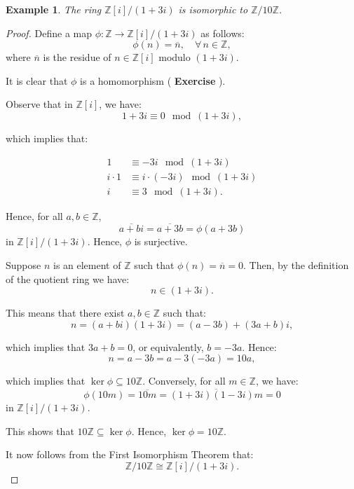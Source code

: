 \documentclass[a4paper,12pt]{report}
\newcommand{\ol}[1]{\overline{#1}}
\newcommand{\ZZ}{\mathbb{Z}}
\newcommand{\ra}{\longrightarrow}
\newcommand{\class}[2]{#2}
\newcounter{statement}
\numberwithin{statement}{chapter}
\newtheorem{eg}[statement]{\bf Example}
\numberwithin{equation}{chapter}
\numberwithin{section}{chapter}
\numberwithin{subsection}{section}
\begin{document}
\begin{eg}
The ring $\mathbb{Z}[i]/(1 + 3i)$ is isomorphic to $\mathbb{Z}/10\ZZ$.
\end{eg}
\begin{proof}

Define a map $\phi: \ZZ \ra \ZZ[i]/(1 + 3i)$ as follows:
\[
\phi(n) = \ol{n},\quad \forall\, n \in \ZZ,
\]
where $\ol{n}$ is the residue of $n \in \ZZ[i]$ modulo $(1 + 3i)$.





It is clear that $\phi$ is a homomorphism ( {\bf Exercise} ).



Observe that in $\mathbb{Z}[i]$, we have:
\[
1 + 3i \equiv 0 \mod (1 + 3i),
\]

which implies that:

\begin{align*}
\class{steps10 steps}{1} & \class{steps10 steps}{\equiv -3i \mod (1 + 3i)}
\\
\class{steps10 steps}{ i\cdot 1} & \class{steps10 steps}{\equiv i \cdot (-3i) \mod (1 + 3i)}
\\
\class{steps10 steps}{i} & \class{steps10 steps}{\equiv 3 \mod (1 + 3i).}
\end{align*}


Hence, for all $a, b \in \ZZ$,
\[
\ol{a + bi} = \ol{a + 3b} = \phi(a + 3b)
\]
in $\ZZ[i]/(1 + 3i)$.  Hence, $\phi$ is surjective.





Suppose $n$ is an element of $\ZZ$ such that $\phi(n) = \ol{n} = 0$.
Then, by the definition of the quotient ring we have:
\[
n \in (1 + 3i).
\]

This means that there exist $a, b \in \ZZ$ such that:
\[
n = (a + bi)(1 + 3i) = (a - 3b) + (3a + b)i,
\]

which implies that $3a + b = 0$, or equivalently, $b = -3a$.  Hence:
\[
n = a - 3b = a - 3(-3a) = 10 a,
\]

which implies that $\ker \phi \subseteq 10\ZZ$.  Conversely, for all $m \in \ZZ$,
we have:
\[
\phi(10 m) = \ol{10 m} = \ol{(1 + 3i)(1 - 3i)m} = 0
\]
in $\ZZ[i]/(1 + 3i)$.


This shows that $10\ZZ \subseteq \ker \phi$.  Hence, $\ker \phi = 10\ZZ$.





It now follows from the First Isomorphism Theorem that:
\[
\ZZ/10\ZZ \cong \ZZ[i]/(1 + 3i).
\]


\end{proof}
\end{document}
